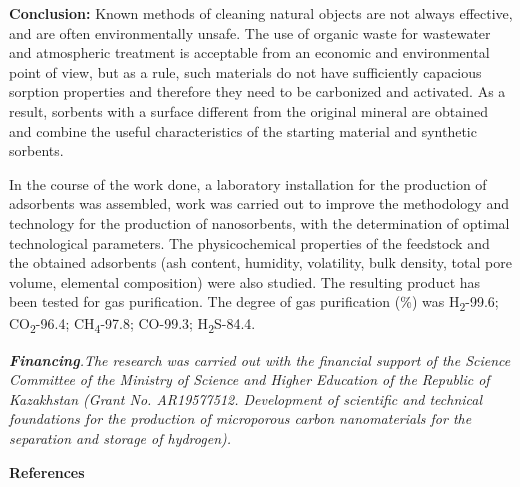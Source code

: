 \begin{multicols}{2}
{\bfseries Conclusion:} Known methods of cleaning natural objects are not
always effective, and are often environmentally unsafe. The use of
organic waste for wastewater and atmospheric treatment is acceptable
from an economic and environmental point of view, but as a rule, such
materials do not have sufficiently capacious sorption properties and
therefore they need to be carbonized and activated. As a result,
sorbents with a surface different from the original mineral are obtained
and combine the useful characteristics of the starting material and
synthetic sorbents.

In the course of the work done, a laboratory installation for the
production of adsorbents was assembled, work was carried out to improve
the methodology and technology for the production of nanosorbents, with
the determination of optimal technological parameters. The
physicochemical properties of the feedstock and the obtained adsorbents
(ash content, humidity, volatility, bulk density, total pore volume,
elemental composition) were also studied. The resulting product has been
tested for gas purification. The degree of gas purification (\%) was
H\textsubscript{2}-99.6; CO\textsubscript{2}-96.4;
CH\textsubscript{4}-97.8; CO-99.3; H\textsubscript{2}S-84.4.

\emph{{\bfseries Financing}.The research was carried out with the financial
support of the Science Committee of the Ministry of Science and Higher
Education of the Republic of Kazakhstan (Grant No. AR19577512.
Development of scientific and technical foundations for the production
of microporous carbon nanomaterials for the separation and storage of
hydrogen).}
\end{multicols}

\begin{center}
{\bfseries References}
\end{center}

